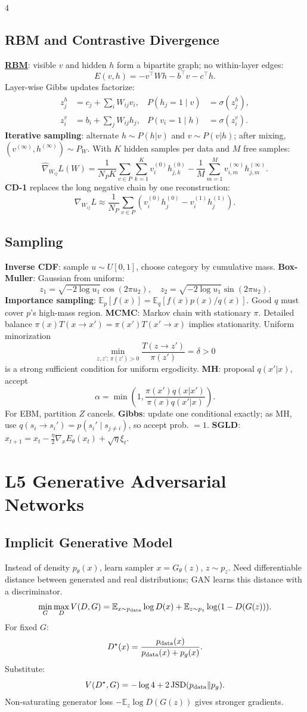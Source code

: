 \documentclass{article}
\newcommand{\key}[1]{\textbf{#1}}
\newcommand{\lowterm}[1]{\textbf{\underline{#1}}}
\newcommand{\E}{\mathbb{E}}
\newcommand{\1}{\mathbf 1}
\begin{document}
\begin{multicols*}{4}
\subsection{RBM and Contrastive Divergence}
\lowterm{RBM}: visible $v$ and hidden $h$ form a bipartite graph; no within-layer edges:
\[
E(v,h)=-v^\top Wh-b^\top v-c^\top h.
\]
Layer-wise Gibbs updates factorize:
\[
\begin{aligned}
z^h_j&=c_j+\sum_iW_{ij}v_i, & P(h_j=1\mid v)&=\sigma(z^h_j),\\
z^v_i&=b_i+\sum_jW_{ij}h_j, & P(v_i=1\mid h)&=\sigma(z^v_i).
\end{aligned}
\]
\key{Iterative sampling}: alternate $h\sim P(h|v)$ and $v\sim P(v|h)$; after mixing, $(v^{(\infty)},h^{(\infty)})\sim P_W$. With $K$ hidden samples per data and $M$ free samples:
\[
\widehat{\nabla}_{W_{ij}}L(W)=
\frac1{N_PK}\sum_{v\in P}\sum_{k=1}^{K}v_i^{(0)}h_{j,k}^{(0)}
-\frac1M\sum_{m=1}^{M}v_{i,m}^{(\infty)}h_{j,m}^{(\infty)}.
\]
\key{CD-1} replaces the long negative chain by one reconstruction:
\[
\nabla_{W_{ij}}L\approx\frac1{N_P}\sum_{v\in P}
\left(v_i^{(0)}h_j^{(0)}-v_i^{(1)}h_j^{(1)}\right).
\]

\subsection{Sampling}
\key{Inverse CDF}: sample $u\sim U[0,1]$, choose category by cumulative mass. \key{Box-Muller}: Gaussian from uniform:
\[
z_1=\sqrt{-2\log u_1}\cos(2\pi u_2),\quad z_2=\sqrt{-2\log u_1}\sin(2\pi u_2).
\]
\key{Importance sampling}: $\E_p[f(x)]=\E_q[f(x)p(x)/q(x)]$. Good $q$ must cover $p$'s high-mass region.
\key{MCMC}: Markov chain with stationary $\pi$. Detailed balance $\pi(x)T(x\to x')=\pi(x')T(x'\to x)$ implies stationarity. Uniform minorization
\[
\min_{z,z':\,\pi(z')>0}\frac{T(z\to z')}{\pi(z')}=\delta>0
\]
is a strong sufficient condition for uniform ergodicity. \key{MH}: proposal $q(x'|x)$, accept
\[
\alpha=\min\left(1,\frac{\pi(x')q(x|x')}{\pi(x)q(x'|x)}\right).
\]
For EBM, partition $Z$ cancels. \key{Gibbs}: update one conditional exactly; as MH, use $q(s_i\to s_i')=p(s_i'\mid s_{j\ne i})$, so accept prob. $=1$. \key{SGLD}: $x_{t+1}=x_t-\frac{\eta}{2}\nabla_xE_\theta(x_t)+\sqrt{\eta}\xi_t$.

\section{L5 Generative Adversarial Networks}
\subsection{Implicit Generative Model}
Instead of density $p_\theta(x)$, learn sampler $x=G_\theta(z)$, $z\sim p_z$. Need differentiable distance between generated and real distributions; GAN learns this distance with a discriminator.
\[
\min_G\max_D V(D,G)=\E_{x\sim p_{\rm data}}\log D(x)+\E_{z\sim p_z}\log(1-D(G(z))).
\]
For fixed $G$:
\[
D^\star(x)=\frac{p_{\rm data}(x)}{p_{\rm data}(x)+p_g(x)}.
\]
Substitute:
\[
V(D^\star,G)=-\log4+2\,{\rm JSD}(p_{\rm data}\|p_g).
\]
Non-saturating generator loss $-\E_z\log D(G(z))$ gives stronger gradients.


\end{multicols*}
\end{document}
